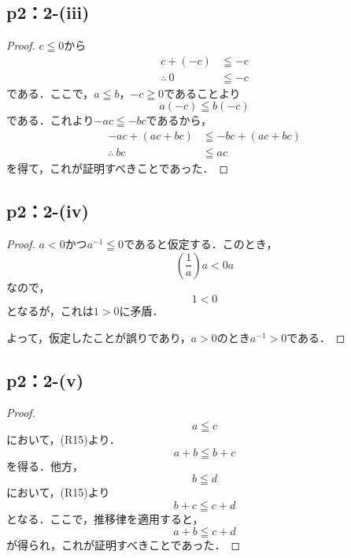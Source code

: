 \documentclass[a4paper,10pt,fleqn]{ltjsarticle}
\begin{document}
\newpage

\subsection*{p2：2-(iii)}

\begin{leftbar}
    \begin{proof}
        $c \leqq 0$から
        \begin{align*}
            c+(-c)         & \leqq -c \\
            \therefore ~ 0 & \leqq -c
        \end{align*}
        である．ここで，$a \leqq b$，$-c \geqq 0$であることより
        \[
            a(-c) \leqq b (-c)
        \]
        である．これより$ -ac \leqq -bc$であるから，
        \begin{align*}
            -ac + (ac+bc)   & \leqq -bc +(ac+bc) \\
            \therefore ~ bc & \leqq ac
        \end{align*}
        を得て，これが証明すべきことであった．
    \end{proof}
\end{leftbar}

\subsection*{p2：2-(iv)}

\begin{leftbar}
    \begin{proof}
        $a<0$かつ$a^{-1} \leqq 0$であると仮定する．このとき，
        \[
            \left ( \frac{1}{a} \right) a < 0a
        \]
        なので，
        \[
            1<0
        \]
        となるが，これは$1>0$に矛盾．

        よって，仮定したことが誤りであり，$a>0$のとき$a^{-1} >0$である．
    \end{proof}
\end{leftbar}

\subsection*{p2：2-(v)}

\begin{leftbar}
    \begin{proof}
        \[
            a \leqq c
        \]
        において，(R15)より．
        \[
            a+b \leqq b+c
        \]
        を得る．他方，
        \[
            b \leqq d
        \]
        において，(R15)より
        \[
            b + c \leqq c+d
        \]
        となる．ここで，推移律を適用すると，
        \[
            a+b \leqq c+d
        \]
        が得られ，これが証明すべきことであった．
    \end{proof}
\end{leftbar}
%
\end{document}
